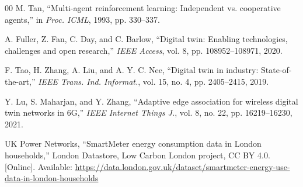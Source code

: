 \documentclass[conference]{IEEEtran}
\begin{document}
\begin{thebibliography}{00}
 M. Tan, ``Multi-agent reinforcement learning: Independent vs. cooperative agents,'' in \emph{Proc. ICML}, 1993, pp. 330--337.


 A. Fuller, Z. Fan, C. Day, and C. Barlow, ``Digital twin: Enabling technologies, challenges and open research,'' \emph{IEEE Access}, vol. 8, pp. 108952--108971, 2020.

 F. Tao, H. Zhang, A. Liu, and A. Y. C. Nee, ``Digital twin in industry: State-of-the-art,'' \emph{IEEE Trans. Ind. Informat.}, vol. 15, no. 4, pp. 2405--2415, 2019.

 Y. Lu, S. Maharjan, and Y. Zhang, ``Adaptive edge association for wireless digital twin networks in 6G,'' \emph{IEEE Internet Things J.}, vol. 8, no. 22, pp. 16219--16230, 2021.

 UK Power Networks, ``SmartMeter energy consumption data in London households,'' London Datastore, Low Carbon London project, CC BY 4.0. [Online]. Available: \url{https://data.london.gov.uk/dataset/smartmeter-energy-use-data-in-london-households}

\end{thebibliography}
\end{document}
